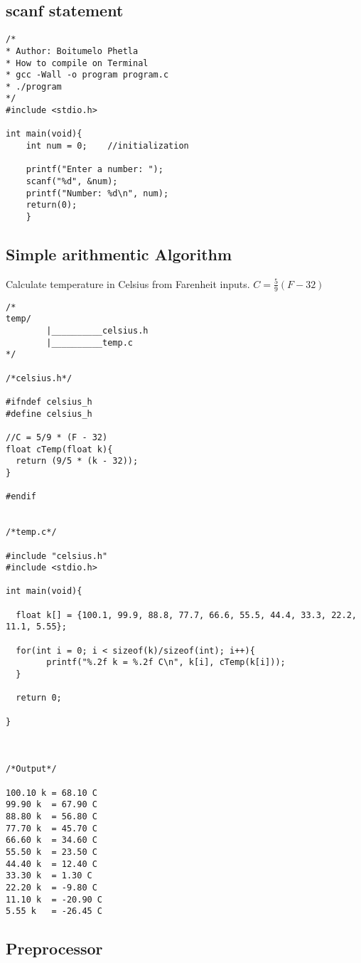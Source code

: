 \documentclass[10pt, a4paper, twocolumn]{article} %
\begin{document}
\subsection{scanf statement}

\begin{lstlisting}
/*
* Author: Boitumelo Phetla
* How to compile on Terminal
* gcc -Wall -o program program.c
* ./program
*/
#include <stdio.h>

int main(void){
	int num = 0;	//initialization

	printf("Enter a number: ");
	scanf("%d", &num);
	printf("Number: %d\n", num);
	return(0);
	}
\end{lstlisting}

\subsection{Simple arithmentic Algorithm}

Calculate temperature in Celsius from Farenheit inputs.
$C = \frac{5}{9}(F - 32)$
\begin{lstlisting}
/*
temp/
		|__________celsius.h
		|__________temp.c
*/

/*celsius.h*/

#ifndef celsius_h
#define celsius_h

//C = 5/9 * (F - 32)
float cTemp(float k){
  return (9/5 * (k - 32));
}

#endif


/*temp.c*/

#include "celsius.h"
#include <stdio.h>

int main(void){

  float k[] = {100.1, 99.9, 88.8, 77.7, 66.6, 55.5, 44.4, 33.3, 22.2, 11.1, 5.55};

  for(int i = 0; i < sizeof(k)/sizeof(int); i++){
    	printf("%.2f k = %.2f C\n", k[i], cTemp(k[i]));
  }

  return 0;

}



/*Output*/

100.10 k = 68.10 C
99.90 k  = 67.90 C
88.80 k  = 56.80 C
77.70 k  = 45.70 C
66.60 k  = 34.60 C
55.50 k  = 23.50 C
44.40 k  = 12.40 C
33.30 k  = 1.30 C
22.20 k  = -9.80 C
11.10 k  = -20.90 C
5.55 k   = -26.45 C
\end{lstlisting}


\subsection{Preprocessor}
\end{document}
